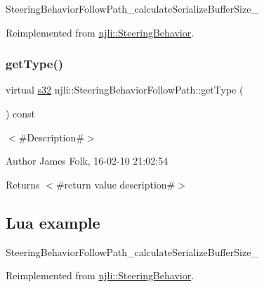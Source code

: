 \begin{DoxyCodeInclude}
\end{DoxyCodeInclude}
Steering\+Behavior\+Follow\+Path\+\_\+calculate\+Serialize\+Buffer\+Size\+\_\+ 

Reimplemented from \mbox{\hyperlink{classnjli_1_1_steering_behavior_abb58d6982dc295fc3e90f096f51b0ef8}{njli\+::\+Steering\+Behavior}}.

\mbox{\label{classnjli_1_1_steering_behavior_follow_path_ac7de5e240b694c37e7eca4a5c41b94d5}} 
\subsubsection{\texorpdfstring{get\+Type()}{getType()}}
{\footnotesize\ttfamily virtual \mbox{\hyperlink{_util_8h_aa62c75d314a0d1f37f79c4b73b2292e2}{s32}} njli\+::\+Steering\+Behavior\+Follow\+Path\+::get\+Type (\begin{DoxyParamCaption}{ }\end{DoxyParamCaption}) const\hspace{0.3cm}{\ttfamily [virtual]}}



$<$\#\+Description\#$>$ 

\begin{DoxyAuthor}{Author}
James Folk, 16-\/02-\/10 21\+:02\+:54
\end{DoxyAuthor}
\begin{DoxyReturn}{Returns}
$<$\#return value description\#$>$
\end{DoxyReturn}
\hypertarget{classnjli_1_1_steering_behavior_wander_ex1}{}\subsection{Lua example}\label{classnjli_1_1_steering_behavior_wander_ex1}

\begin{DoxyCodeInclude}
\end{DoxyCodeInclude}
Steering\+Behavior\+Follow\+Path\+\_\+calculate\+Serialize\+Buffer\+Size\+\_\+ 

Reimplemented from \mbox{\hyperlink{classnjli_1_1_steering_behavior_ae82bca8468d41aff8c22b76fd359fe9b}{njli\+::\+Steering\+Behavior}}.

